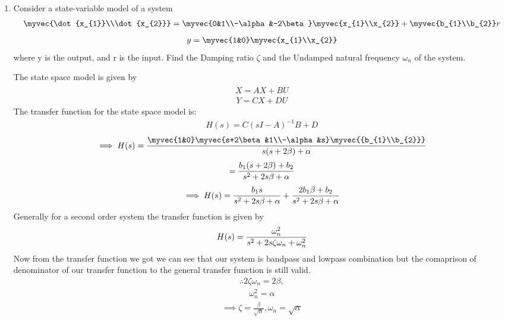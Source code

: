 \begin{enumerate}[label=\thesection.\arabic*.,ref=\thesection.\theenumi]

\item Consider a state-variable model of a system 
\begin{align}
\myvec{\dot{x_{1}}\\\dot{x_{2}}}
=
\myvec{0&1\\-\alpha&-2\beta}\myvec{x_{1}\\x_{2}}
+
\myvec{b_{1}\\b_{2}}  r
\end{align}
\begin{align}
y
=
\myvec{1&0}\myvec{x_{1}\\x_{2}}
\end{align}
where y is the output, and r is the input.
%
Find the Damping ratio $\zeta$ and the Undamped natural frequency $\omega_{n}$ of the system.

\solution The state space model is given by
\begin{align}
\dot{X} = AX + BU
\end{align}
\begin{align}
Y = CX + DU
\end{align}
%
The transfer function for the state space model is:
\begin{align}
H(s) = C(sI - A)^{-1}B + D
\end{align}
\begin{align}
\implies H(s) = \frac{\myvec{1&0}\myvec{s+2\beta&1\\-\alpha&s}\myvec{{b_{1}\\b_{2}}}}{s(s+2\beta) + \alpha}
\end{align}
\begin{align}
= \LARGE{\frac{b_{1}(s+2\beta) + b_{2}}{s^{2}+2s\beta+\alpha}}
\end{align}
\begin{align}
   \implies H(s) = \LARGE{\frac{b_{1}s}{s^{2}+2s\beta+\alpha}} + \LARGE{\frac{2b_{1}\beta + b_{2}}{s^{2}+2s\beta+\alpha}}
\end{align}
Generally for a second order system the transfer function is given by
\begin{align}
H(s) = \LARGE{\frac{\omega_{n}^2}{s^{2}+2s\zeta\omega_{n}+\omega_{n}^2}}
\end{align}
Now from the transfer function we got we can see that our system is bandpass and lowpass combination but the comaprison of denominator of our transfer function to the general transfer function is still valid.
\begin{align}
\therefore 2\zeta\omega_{n} = 2\beta,
\end{align}
\begin{align}
\omega_{n}^2 = \alpha
\end{align}
\begin{align}
\implies \zeta = \frac{\beta}{\sqrt{\alpha}} , \omega_{n} = \sqrt{\alpha}
\end{align}
\end{enumerate}

